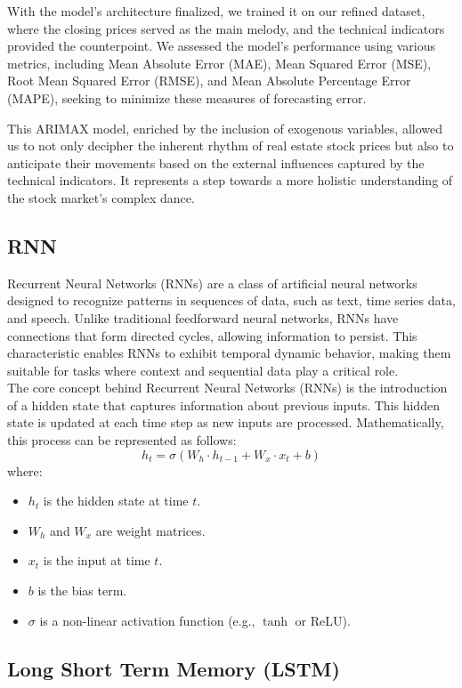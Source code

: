 \documentclass{ieeeojies}
\begin{document}
With the model's architecture finalized, we trained it on our refined dataset, where the closing prices served as the main melody, and the technical indicators provided the counterpoint. We assessed the model's performance using various metrics, including Mean Absolute Error (MAE), Mean Squared Error (MSE), Root Mean Squared Error (RMSE), and Mean Absolute Percentage Error (MAPE), seeking to minimize these measures of forecasting error.

This ARIMAX model, enriched by the inclusion of exogenous variables, allowed us to not only decipher the inherent rhythm of real estate stock prices but also to anticipate their movements based on the external influences captured by the technical indicators. It represents a step towards a more holistic understanding of the stock market's complex dance.


  \subsection{RNN}
  Recurrent Neural Networks (RNNs) are a class of artificial neural networks designed to recognize patterns in sequences of data, such as text, time series data, and speech. Unlike traditional feedforward neural networks, RNNs have connections that form directed cycles, allowing information to persist. This characteristic enables RNNs to exhibit temporal dynamic behavior, making them suitable for tasks where context and sequential data play a critical role.
  \\ The core concept behind Recurrent Neural Networks (RNNs) is the introduction of a hidden state that captures information about previous inputs. This hidden state is updated at each time step as new inputs are processed. Mathematically, this process can be represented as follows:
  \[
  h_t = \sigma(W_h \cdot h_{t-1} + W_x \cdot x_t + b)
  \]
  where:
  \begin{itemize}
      \item $h_t$ is the hidden state at time $t$.
      \item $W_h$ and $W_x$ are weight matrices.
      \item $x_t$ is the input at time $t$.
      \item $b$ is the bias term.
      \item $\sigma$ is a non-linear activation function (e.g., $\tanh$ or $\text{ReLU}$).
  \end{itemize}  
  \subsection{Long Short Term Memory (LSTM)}
\end{document}
